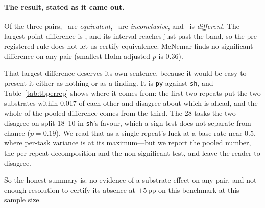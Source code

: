 \documentclass[11pt,a4paper]{article}
\begin{document}
\begin{table}[h]\centering\small
\caption{Disposition of the trials that did not simply pass or fail.}
\label{tab:tbexclusions}

\end{table}

\begin{table}[h]\centering\small
\caption{Pairwise equivalence on Terminal-Bench, paired by task, pooled over
repeats, 10{,}000-resample cluster bootstrap, pre-registered $\pm5$\,pp band.}
\label{tab:tbequiv}

\end{table}

\begin{table}[h]\centering\small
\caption{The same substrate differences, one repeat at a time. A difference
that is real should persist across repeats; one that lives in a single repeat
is the model being unstable on hard tasks.}
\label{tab:tbperrep}

\end{table}

\paragraph{The result, stated as it came out.}
Of the three pairs, \tbequiv\ are \emph{equivalent}, \tbinconclusive\ are
\emph{inconclusive}, and \tbdifferent\ is \emph{different}. The largest point
difference is \tbmaxdiff, and its interval reaches just past the band, so the
pre-registered rule does not let us certify equivalence. McNemar finds no
significant difference on any pair (smallest Holm-adjusted $p$ is 0.36).

That largest difference deserves its own sentence, because it would be easy to
present it either as nothing or as a finding. It is \texttt{py} against
\texttt{sh}, and Table~\ref{tab:tbperrep} shows where it comes from: the first
two repeats put the two substrates within 0.017 of each other and disagree
about which is ahead, and the whole of the pooled difference comes from the
third. The 28 tasks the two disagree on split 18--10 in \texttt{sh}'s favour,
which a sign test does not separate from chance ($p=0.19$). We read that as a single repeat's luck at a base rate near 0.5, where
per-task variance is at its maximum---but we report the pooled number, the
per-repeat decomposition and the non-significant test, and leave the reader to
disagree.

So the honest summary is: no evidence of a substrate effect on any pair, and
not enough resolution to certify its absence at $\pm5$\,pp on this benchmark at
this sample size.
\end{document}

